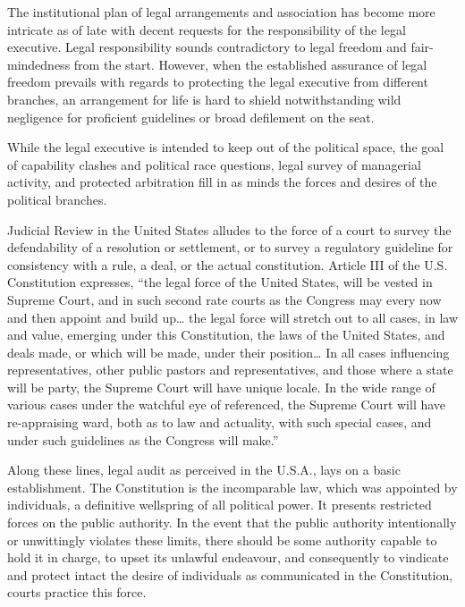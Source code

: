 \begin{multicols}{2}
\vspace{.02cm}

\noi
The institutional plan of legal arrangements and association has become more intricate as of
late with decent requests for the responsibility of the legal executive. Legal responsibility
sounds contradictory to legal freedom and fair-mindedness from the start. However, when the
established assurance of legal freedom prevails with regards to protecting the legal executive
from different branches, an arrangement for life is hard to shield notwithstanding wild
negligence for proficient guidelines or broad defilement on the seat. 

\vspace{-.1cm}

\noi
While the legal executive is intended to keep out of the political space, the goal of capability
clashes and political race questions, legal survey of managerial activity, and protected
arbitration fill in as minds the forces and desires of the political branches.

\vspace{-.1cm}


\vspace{-.1cm}

\noi
Judicial Review in the United States alludes to the force of a court to survey the defendability
of a resolution or settlement, or to survey a regulatory guideline for consistency with a rule, a
deal, or the actual constitution. Article III of the U.S. Constitution expresses, “the legal force
of the United States, will be vested in Supreme Court, and in such second rate courts as the
Congress may every now and then appoint and build up… the legal force will stretch out to
all cases, in law and value, emerging under this Constitution, the laws of the United States,
and deals made, or which will be made, under their position… In all cases influencing
representatives, other public pastors and representatives, and those where a state will be
party, the Supreme Court will have unique locale. In the wide range of various cases under
the watchful eye of referenced, the Supreme Court will have re-appraising ward, both as to
law and actuality, with such special cases, and under such guidelines as the Congress will
make.”

\vspace{-.1cm}

\noi
Along these lines, legal audit as perceived in the U.S.A., lays on a basic establishment. The
Constitution is the incomparable law, which was appointed by individuals, a definitive
wellspring of all political power. It presents restricted forces on the public authority. In the
event that the public authority intentionally or unwittingly violates these limits, there should
be some authority capable to hold it in charge, to upset its unlawful endeavour, and consequently to vindicate and protect intact the desire of individuals as communicated in the
Constitution, courts practice this force.


\end{multicols}
